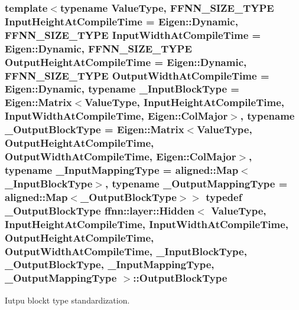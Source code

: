 \hypertarget{classffnn_1_1layer_1_1_hidden_abb03ddc71360cc7ebdab03cd4d1553ee}{
\subsubsection[{Output\-Block\-Type}]{\setlength{\rightskip}{0pt plus 5cm}template$<$typename Value\-Type, F\-F\-N\-N\-\_\-\-S\-I\-Z\-E\-\_\-\-T\-Y\-P\-E Input\-Height\-At\-Compile\-Time = Eigen\-::\-Dynamic, F\-F\-N\-N\-\_\-\-S\-I\-Z\-E\-\_\-\-T\-Y\-P\-E Input\-Width\-At\-Compile\-Time = Eigen\-::\-Dynamic, F\-F\-N\-N\-\_\-\-S\-I\-Z\-E\-\_\-\-T\-Y\-P\-E Output\-Height\-At\-Compile\-Time = Eigen\-::\-Dynamic, F\-F\-N\-N\-\_\-\-S\-I\-Z\-E\-\_\-\-T\-Y\-P\-E Output\-Width\-At\-Compile\-Time = Eigen\-::\-Dynamic, typename \-\_\-\-Input\-Block\-Type = Eigen\-::\-Matrix$<$\-Value\-Type, Input\-Height\-At\-Compile\-Time, Input\-Width\-At\-Compile\-Time, Eigen\-::\-Col\-Major$>$, typename \-\_\-\-Output\-Block\-Type = Eigen\-::\-Matrix$<$\-Value\-Type, Output\-Height\-At\-Compile\-Time, Output\-Width\-At\-Compile\-Time, Eigen\-::\-Col\-Major$>$, typename \-\_\-\-Input\-Mapping\-Type = aligned\-::\-Map$<$\-\_\-\-Input\-Block\-Type$>$, typename \-\_\-\-Output\-Mapping\-Type = aligned\-::\-Map$<$\-\_\-\-Output\-Block\-Type$>$$>$ typedef \-\_\-\-Output\-Block\-Type {\bf ffnn\-::layer\-::\-Hidden}$<$ Value\-Type, Input\-Height\-At\-Compile\-Time, Input\-Width\-At\-Compile\-Time, Output\-Height\-At\-Compile\-Time, Output\-Width\-At\-Compile\-Time, \-\_\-\-Input\-Block\-Type, \-\_\-\-Output\-Block\-Type, \-\_\-\-Input\-Mapping\-Type, \-\_\-\-Output\-Mapping\-Type $>$\-::{\bf Output\-Block\-Type}}}\label{classffnn_1_1layer_1_1_hidden_abb03ddc71360cc7ebdab03cd4d1553ee}


Iutpu blockt type standardization. 

